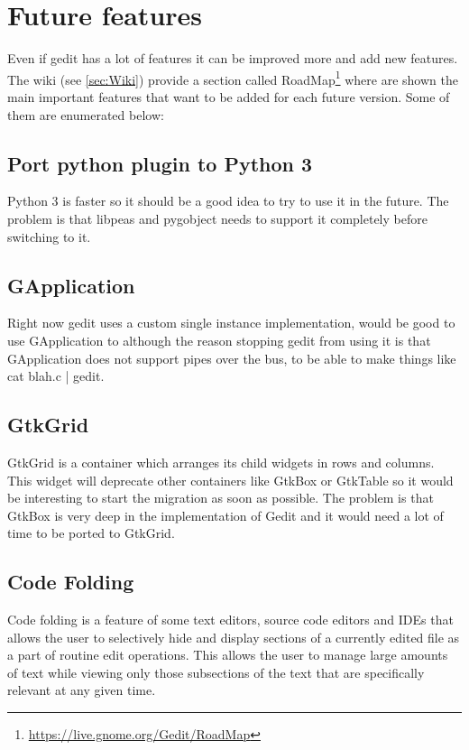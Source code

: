 
\chapter{Future features}

Even if gedit has a lot of features it can be improved more and add new features. The wiki (see \ref{sec:Wiki}) provide a section called RoadMap\footnote{\url{https://live.gnome.org/Gedit/RoadMap}} where are shown the main important features that want to be added for each future version. Some of them are enumerated below:

\section{Port python plugin to Python 3}

Python 3 is faster so it should be a good idea to try to use it in the future. The problem is that libpeas and pygobject needs to support it completely before switching to it.

\section{GApplication}

Right now gedit uses a custom single instance implementation, would be good to use GApplication to although the reason stopping gedit from using it is that GApplication does not support pipes over the bus, to be able to make things like cat blah.c | gedit.

\section{GtkGrid}

GtkGrid is a container which arranges its child widgets in rows and columns. This widget will deprecate other containers like GtkBox or GtkTable so it would be interesting to start the migration as soon as possible. The problem is that GtkBox is very deep in the implementation of Gedit and it would need a lot of time to be ported to GtkGrid.

\section{Code Folding}

Code folding is a feature of some text editors, source code editors and IDEs that allows the user to selectively hide and display sections of a currently edited file as a part of routine edit operations. This allows the user to manage large amounts of text while viewing only those subsections of the text that are specifically relevant at any given time.\cite{website:code-folding}


